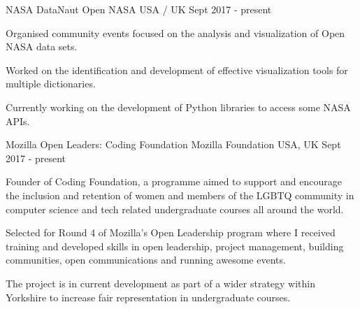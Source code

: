 


\begin{cventries}


\cventry
{NASA DataNaut} %
{Open NASA} %
{USA / UK} %
{Sept 2017 - present} %
{ %
\begin{cvitems}
\item {Organised community events focused on the analysis and visualization of Open NASA data sets.}
\item{Worked on the identification and development of effective visualization tools for multiple dictionaries.}
\item{Currently working on the development of Python libraries to access some NASA APIs.}
\end{cvitems}
}


\cventry
{Mozilla Open Leaders: Coding Foundation}
{Mozilla Foundation}
{USA, UK}
{Sept 2017 - present}
{
\begin{cvitems}
\item Founder of Coding Foundation, a programme aimed to support and encourage the inclusion and retention of women and members of the LGBTQ community in computer science and tech related undergraduate courses all around the world.
\item Selected for Round 4 of Mozilla’s Open Leadership program where I received training and developed skills in open leadership, project
management, building communities, open communications and running awesome events.
\item The project is in current development as part of a wider strategy within Yorkshire to increase fair representation in undergraduate courses.
\end{cvitems}
}


\end{cventries}